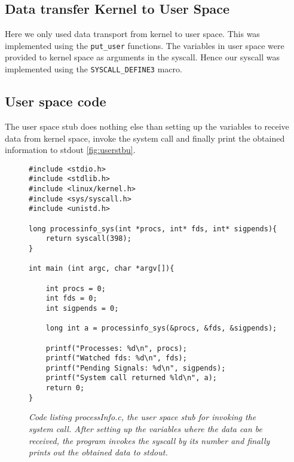 \documentclass[a4paper,11pt,twoside]{article}
\begin{document}
\subsection{Data transfer Kernel to User Space}
Here we only used data transport from kernel to user space. This was
implemented using the \verb+put_user+ functions. The variables in user space
were provided to kernel space as arguments in the syscall. Hence
our syscall was implemented using the \verb'SYSCALL_DEFINE3' macro.

\subsection{User space code}
The user space stub does nothing else than setting up the variables to
receive data from kernel space, invoke the system call and finally print
the obtained information to stdout \ref{fig:userstbu}.

\begin{figure}
  \label{fig:sigpending}
  \centering
  \begin{verbatim}
#include <stdio.h>
#include <stdlib.h>
#include <linux/kernel.h>
#include <sys/syscall.h>
#include <unistd.h>

long processinfo_sys(int *procs, int* fds, int* sigpends){
	return syscall(398);
}

int main (int argc, char *argv[]){

	int procs = 0;
	int fds = 0;
	int sigpends = 0;

	long int a = processinfo_sys(&procs, &fds, &sigpends);

	printf("Processes: %d\n", procs);
	printf("Watched fds: %d\n", fds);
	printf("Pending Signals: %d\n", sigpends);
	printf("System call returned %ld\n", a);
	return 0;
}

  \end{verbatim}
  \caption{\textit{Code listing processInfo.c, the user space stub for
  invoking the system call. After setting up the variables where the data
  can be received, the program invokes the syscall by its number and finally
  prints out the obtained data to stdout.}}

\end{figure}


\end{document}
